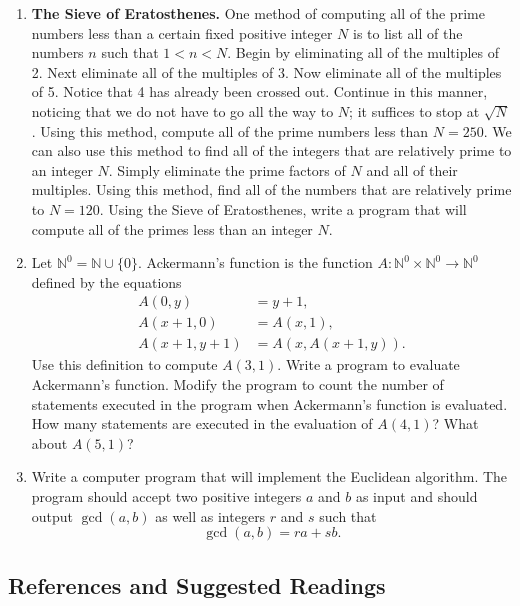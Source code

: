 {\small
\begin{enumerate}
 
\item
\textbf{The Sieve of Eratosthenes.}  
One method of computing all of the prime numbers less than a certain fixed positive integer $N$ is to list all of the numbers $n$ such that $1 < n < N$.  Begin by eliminating all of the multiples of 2.  Next eliminate all of the multiples of 3. Now eliminate all of the  multiples of 5.  Notice that 4 has already been crossed out.  Continue in this manner, noticing that we do not have to go all the way to $N$; it suffices to stop at $\sqrt{N}$.  Using this method, compute all of the prime numbers less than $N = 250$.  We can also use this method to find all of the integers that are relatively prime to an integer $N$.  Simply eliminate the prime factors of $N$ and all of their multiples.  Using this method, find all of the numbers that are relatively prime to $N= 120$.  Using the Sieve of Eratosthenes, write a program that will compute all of the primes less than an integer $N$. 

\item
Let ${\mathbb N}^0 = {\mathbb N} \cup \{ 0 \}$. Ackermann's function is the function $A :{\mathbb N}^0 \times {\mathbb N}^0 \rightarrow {\mathbb N}^0$ defined by the equations 
\begin{align*}
A(0, y) & = y + 1, \\
A(x + 1, 0) & = A(x, 1), \\
A(x + 1, y + 1) & = A(x, A(x + 1, y)).
\end{align*}
Use this definition to compute $A(3, 1)$.  Write a program to evaluate Ackermann's function.  Modify the  program to count the number of statements executed in the program when Ackermann's function is evaluated.  How many statements are executed in the evaluation of $A(4, 1)$?  What about $A(5, 1)$?

\item
Write a computer program that will implement the Euclidean algorithm.  The program should accept two positive integers $a$ and $b$ as input and should output $\gcd( a,b)$ as well as integers $r$ and $s$ such that 
\[
\gcd( a,b) = ra + sb.
\]
 
\end{enumerate}
}
 
 
\subsection*{References and Suggested Readings} %


